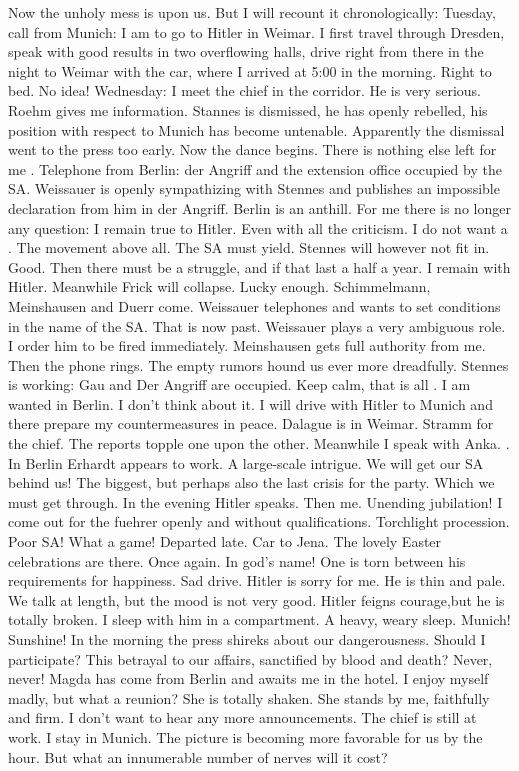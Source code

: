 Now the unholy mess is upon us. But I will recount it chronologically: Tuesday, call from Munich: I am to go to Hitler in Weimar. I first travel through Dresden, speak with good results in two overflowing halls, drive right from there in the night to Weimar with the car, where I arrived at 5:00 in the morning. Right to bed. No idea!
Wednesday: I meet the chief in the corridor. He is very serious. Roehm gives me information. Stannes is dismissed, he has openly rebelled, his position with respect to Munich has become untenable. Apparently the dismissal went to the press too early. Now the dance begins. There is nothing else left for me . Telephone from Berlin: der Angriff and the extension office occupied by the SA. Weissauer is openly sympathizing with Stennes and publishes an impossible declaration from him in der Angriff. Berlin is an anthill. For me there is no longer any question: I remain true to Hitler. Even with all the criticism. I do not want a . The movement above all. The SA must yield. Stennes will however not fit in. Good. Then there must be a struggle, and if that last a half a year. I remain with Hitler. Meanwhile Frick will collapse. Lucky enough. Schimmelmann, Meinshausen and Duerr come. Weissauer telephones  and wants to set conditions in the name of the SA. That is now past. Weissauer plays a very ambiguous role. I order him to be fired immediately. Meinshausen gets full authority from me. Then the phone rings. The empty rumors hound us ever more dreadfully. Stennes is working: Gau and Der Angriff are occupied. Keep calm, that is all . I am wanted in Berlin. I don't think about it. I will drive with Hitler to Munich and there prepare my countermeasures in peace. Dalague is in Weimar. Stramm for the chief. The reports topple one upon the other. Meanwhile I speak  with Anka. . In Berlin Erhardt appears to work. A large-scale intrigue. We will get our SA behind us! The biggest, but perhaps also the last crisis for the party. Which we must get through. In the evening Hitler speaks. Then me. Unending jubilation! I come out for the fuehrer openly and without qualifications. Torchlight procession. Poor SA! What a  game! Departed late. Car to Jena. The lovely Easter celebrations are there. Once again. In god's name! One is torn between his requirements for happiness. Sad drive. Hitler is sorry for me. He is thin and pale. We talk at length, but the mood is not very good. Hitler feigns courage,but he is totally broken. I sleep with him in a compartment. A heavy, weary sleep. Munich! Sunshine! In the morning the press shireks about our dangerousness. Should I participate? This betrayal to our affairs, sanctified by blood and death? Never, never! Magda has come from Berlin and awaits me in the hotel. I enjoy myself madly, but what a reunion? She is totally shaken.  She stands by me, faithfully and firm. I don't want to hear any more announcements. The chief is still at work. I stay in Munich. The picture is becoming more favorable for us by the hour. But what an innumerable number of nerves will it cost?
